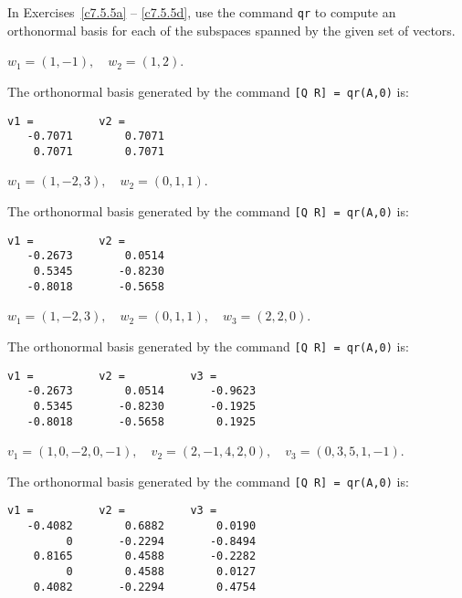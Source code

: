 \documentclass{ximera}
\begin{document}
\CEXER

In Exercises~\ref{c7.5.5a} -- \ref{c7.5.5d}, use the \Matlab command
{\tt qr} to compute an orthonormal basis for each of the subspaces spanned
by the given set of vectors.
\begin{exercise} \label{c7.5.5a}
$w_1=(1,-1),\quad w_2=(1,2)$.

\begin{solution}

The orthonormal basis generated by the command {\tt [Q R] = qr(A,0)} is:
\begin{verbatim}
v1 =          v2 =
   -0.7071        0.7071
    0.7071        0.7071
\end{verbatim}

\end{solution}
\end{exercise}
\begin{exercise} \label{c7.5.5b}
$w_1=(1,-2,3),\quad w_2=(0,1,1)$.

\begin{solution}

The orthonormal basis generated by the command {\tt [Q R] = qr(A,0)} is:

\begin{verbatim}
v1 =          v2 =
   -0.2673        0.0514
    0.5345       -0.8230
   -0.8018       -0.5658
\end{verbatim}

\end{solution}
\end{exercise}
\begin{exercise} \label{c7.5.5c}
$w_1=(1,-2,3),\quad w_2=(0,1,1),\quad w_3=(2,2,0)$.

\begin{solution}

The orthonormal basis generated by the command {\tt [Q R] = qr(A,0)} is:
\begin{verbatim}
v1 =          v2 =          v3 = 
   -0.2673        0.0514       -0.9623
    0.5345       -0.8230       -0.1925
   -0.8018       -0.5658        0.1925
\end{verbatim}

\end{solution}
\end{exercise}
\begin{exercise} \label{c7.5.5d}
$v_1=(1,0,-2,0,-1),\quad v_2=(2,-1,4,2,0),\quad v_3=(0,3,5,1,-1)$.

\begin{solution}

The orthonormal basis generated by the command {\tt [Q R] = qr(A,0)} is:

\begin{verbatim}
v1 =          v2 =          v3 = 
   -0.4082        0.6882        0.0190
         0       -0.2294       -0.8494
    0.8165        0.4588       -0.2282
         0        0.4588        0.0127
    0.4082       -0.2294        0.4754
\end{verbatim}

\end{solution}
\end{exercise}
\end{document}
